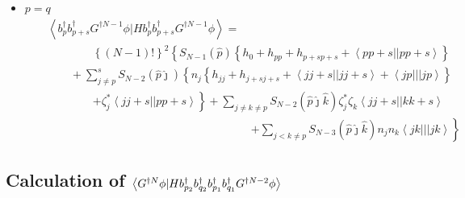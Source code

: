 \begin{itemize}
\item $p=q$%
\begin{eqnarray}
&&\left\langle b_{p}^{\dagger }b_{p+s}^{\dagger }G^{\dagger N-1}\phi
|Hb_{p}^{\dagger }b_{p+s}^{\dagger }G^{\dagger N-1}\phi \right\rangle = 
\nonumber \\
&&\qquad \qquad \left\{ \left( N-1\right) !\right\} ^{2}\left\{
S_{N-1}\left( \hat{p}\right) \left\{ h_{0}+h_{pp}+h_{p+sp+s}+\left\langle
pp+s||pp+s\right\rangle \right\} \right.  \nonumber \\
&&\left. {}\right. \qquad +\sum_{j\neq p}^{s}S_{N-2}\left( \hat{p}\hat{\jmath%
}\right) \left\{ n_{j}\left\{ h_{jj}+h_{j+sj+s}+\left\langle
jj+s||jj+s\right\rangle +\left\langle jp|||jp\right\rangle \right\} \right. 
\nonumber \\
&&\left. {}\right. \qquad \qquad \left. +\zeta _{j}^{\ast }\left\langle
jj+s||pp+s\right\rangle \right\} +\sum_{j\neq k\neq p}S_{N-2}\left( \hat{p}%
\hat{\jmath}\hat{k}\right) \zeta _{j}^{\ast }\zeta _{k}\left\langle
jj+s||kk+s\right\rangle  \nonumber \\
&&\qquad \qquad \qquad \qquad \qquad \qquad \qquad \qquad \qquad \left.
+\sum_{j<k\neq p}S_{N-3}\left( \hat{p}\hat{\jmath}\hat{k}\right)
n_{j}n_{k}\left\langle jk|||jk\right\rangle \right\}
\end{eqnarray}
\end{itemize}

\subsection{Calculation of $\left\langle G^{\dagger N}\protect\phi %
|Hb_{p_{2}}^{\dagger }b_{q_{2}}^{\dagger }b_{p_{1}}^{\dagger
}b_{q_{1}}^{\dagger }G^{\dagger N-2}\protect\phi \right\rangle $}

